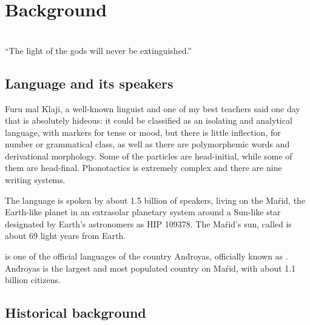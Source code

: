 \chapter{Background}
\label{ch:background}

\begin{flushright}\small
    \\
    ``The light of the gods will never be extinguished.''
\end{flushright}\bigskip

\section{Language and its speakers}

Furu mal Klaji, a well-known linguist and one of my best teachers said one day
that \andro is absolutely hideous: it could be classified as an isolating and
analytical language, with markers for tense or mood, but there is little
inflection, for number or grammatical class, as well as there are polymorphemic
words and derivational morphology. Some of the particles are head-initial, while
some of them are head-final. Phonotactics is extremely complex and there are
nine writing systems.

\skipline

The \andro language is spoken by about 1.5 billion of speakers, living on the
Maŕid, the Earth-like planet in an extrasolar planetary system around a Sun-like
star designated by Earth's astronomers as HIP 109378. The Maŕid's sun, called
 is about 69 light years from Earth.

\skipline

\andro is one of the official languages of the country And́royas, officially
known as . And́royas is the
largest and most populated country on Maŕid, with about 1.1 billion citizens.

\section{Historical background}


